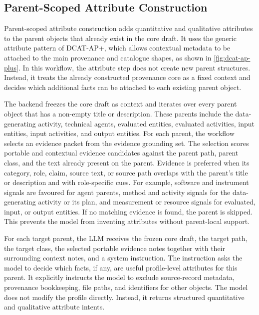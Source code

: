 \subsection{Parent-Scoped Attribute Construction}
\label{sec:parent_scoped_attribute_construction}

Parent-scoped attribute construction adds quantitative and qualitative attributes to the parent objects that already exist in the core draft.
It uses the generic attribute pattern of \ac{DCAT-AP+}, which allows contextual metadata to be attached to the main provenance and catalogue shapes, as shown in \cref{fig:dcat-ap-plus}.
In this workflow, the attribute step does not create new parent structures.
Instead, it treats the already constructed provenance core as a fixed context and decides which additional facts can be attached to each existing parent object.

The backend freezes the core draft as context and iterates over every parent object that has a non-empty title or description.
These parents include the data-generating activity, technical agents, evaluated entities, evaluated activities, input entities, input activities, and output entities.
For each parent, the workflow selects an evidence packet from the evidence grounding set.
The selection scores portable and contextual evidence candidates against the parent path, parent class, and the text already present on the parent.
Evidence is preferred when its category, role, claim, source text, or source path overlaps with the parent's title or description and with role-specific cues.
For example, software and instrument signals are favoured for agent parents, method and activity signals for the data-generating activity or its plan, and measurement or resource signals for evaluated, input, or output entities.
If no matching evidence is found, the parent is skipped.
This prevents the model from inventing attributes without parent-local support.

For each target parent, the \ac{LLM} receives the frozen core draft, the target path, the target class, the selected portable evidence notes together with their surrounding context notes, and a system instruction.
The instruction asks the model to decide which facts, if any, are useful profile-level attributes for this parent.
It explicitly instructs the model to exclude source-record metadata, provenance bookkeeping, file paths, and identifiers for other objects.
The model does not modify the profile directly.
Instead, it returns structured quantitative and qualitative attribute intents.

